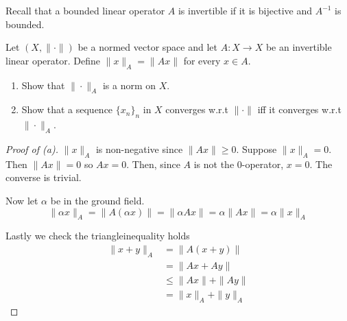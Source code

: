 \begin{prob}[4 Exam 2021]
    Recall that a bounded linear operator $A$ is invertible if it 
    is bijective and $A^{-1}$ is bounded.

    Let $(X,\|\cdot\|)$ be a normed vector space and let 
    $A : X \to X$ be an invertible linear operator. Define 
    $\|x\|_A = \|Ax\|$ for every $x \in A$.

    \begin{enumerate}[label=\alph*)]
        \item Show that $\|\cdot\|_A$ is a norm on $X$.
        \item Show that a sequence $\{x_n\}_n$ in $X$ converges 
            w.r.t $\|\cdot\|$ iff it converges w.r.t 
            $\|\cdot\|_A$.
    \end{enumerate}
\end{prob}
\begin{proof}[Proof of (a)]
    $\|x\|_A$ is non-negative since $\|Ax\| \geq 0$. 
    Suppose $\|x\|_A = 0$. Then $\|Ax\| = 0$ so 
    $Ax = 0$. Then, since $A$ is not the $0$-operator, 
    $x = 0$. The converse is trivial.

    Now let $\alpha$ be in the ground field. 
    \[
        \|\alpha x\|_A = \|A(\alpha x)\| = \|\alpha A x\| 
        = \alpha \|Ax\| = \alpha \|x\|_A
    \]

    Lastly we check the triangleinequality holds 
    \begin{align*}
        \|x+y\|_A &= \|A(x+y)\| \\ 
                  &= \|Ax + Ay\| \\ 
                  &\leq \|Ax\| + \|Ay\| \\ 
                  &= \|x\|_A + \|y\|_A
    \end{align*}
\end{proof}
